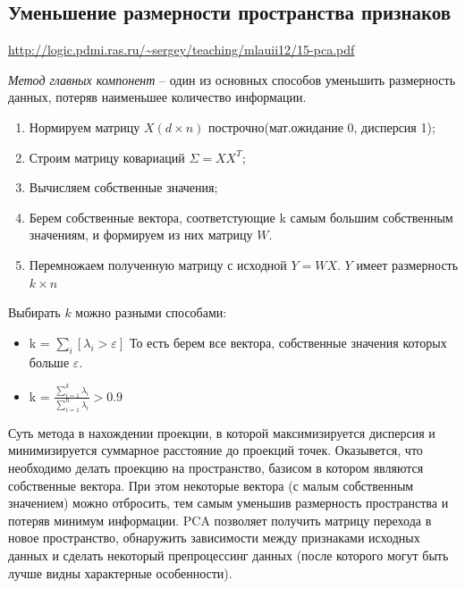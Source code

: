 \documentclass[a4paper,12pt]{article}
\begin{document}
\subsection*{Уменьшение размерности пространства признаков}
\url{http://logic.pdmi.ras.ru/~sergey/teaching/mlauii12/15-pca.pdf}

\textit{Метод главных компонент} -- один из основных способов уменьшить размерность данных, потеряв наименьшее количество информации. 
\begin{enumerate}
    \item Нормируем матрицу $X(d \times n)$ построчно(мат.ожидание 0, дисперсия 1);
    \item Строим матрицу ковариаций $\Sigma=XX^T$;
    \item Вычисляем собственные значения;
    \item Берем собственные вектора, соответстующие k самым большим собственным значениям, и формируем из них матрицу $W$.
    \item Перемножаем полученную матрицу с исходной $Y=WX$. $Y$ имеет размерность $k \times n$ 
\end{enumerate}

Выбирать $k$ можно разными способами:
\begin{itemize}
    \item k = $\sum_i{[\lambda_i>\varepsilon]}$ То есть берем все вектора, собственные значения которых больше $\varepsilon$.
    \item k = $\frac{\sum_{i=1}^k\lambda_i}{\sum_{i=1}^n\lambda_i} > 0.9$
\end{itemize}

Суть метода в нахождении проекции, в которой максимизируется дисперсия и минимизируется суммарное расстояние до проекций точек. 
Оказывется, что необходимо делать проекцию на пространство, базисом в котором являются собственные вектора. 
При этом некоторые вектора (с малым собственным значением) можно отбросить, тем самым уменьшив размерность пространства и потеряв минимум информации. 
PCA позволяет получить матрицу перехода в новое пространство, обнаружить зависимости между признаками исходных данных и сделать некоторый препроцессинг данных (после которого могут быть лучше видны характерные особенности).
\end{document}
